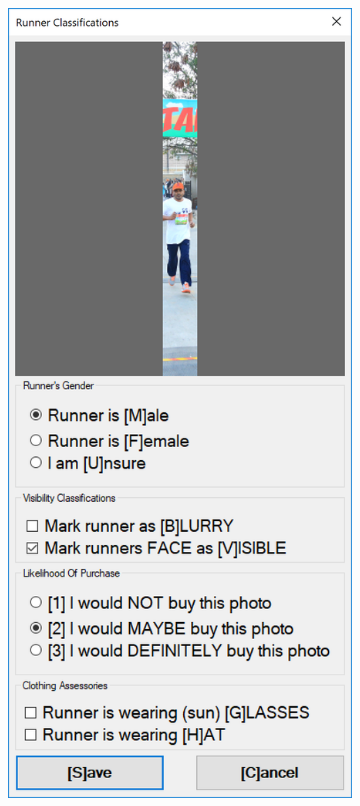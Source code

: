 \begin{figure}
  \hspace{\fill}
  \begin{subfigure}[b]{0.45\textwidth}
    \includegraphics[width=\textwidth]{images/dataset/argus/argus_prom_entry}

\end{subfigure}
\end{figure}
